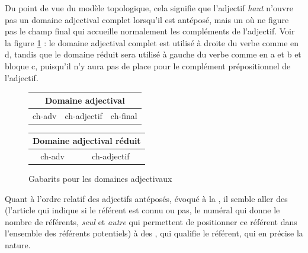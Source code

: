 {    \ea\label{ex:mur}
    \z
    \z
    
    Du point de vue du modèle topologique, cela signifie que l’adjectif \textit{haut} n’ouvre pas un domaine adjectival complet lorsqu’il est antéposé, mais un  où ne figure pas le champ final qui accueille normalement les compléments de l’adjectif. Voir la figure \ref{fig:domaine-adj} : le domaine adjectival complet est utilisé à droite du verbe comme en d, tandis que le domaine réduit sera utilisé à gauche du verbe comme en a et b et bloque c, puisqu'il n'y aura pas de place pour le complément prépositionnel de l'adjectif.

\begin{figure}[H]
    \caption{Gabarits pour les domaines adjectivaux}
    \label{fig:domaine-adj}
        \begin{center}
    \def\arraystretch{1.5}
    \setlength{\tabcolsep}{4ex}
    \begin{tabular}{|c|c|c|}
    \hline
    \multicolumn{3}{|c|}{\cellcolor{lsDOIGray}Domaine adjectival}\\\hline
    ch-adv & \cellcolor{lsDOIGray} ch-adjectif & ch-final\\
    \hline
    \end{tabular}
    \end{center}
   \begin{center}
    \def\arraystretch{1.5}
    \setlength{\tabcolsep}{4ex}
    \begin{tabular}{|c|c|}
    \hline
    \multicolumn{2}{|c|}{\cellcolor{lsDOIGray}Domaine adjectival réduit}\\\hline
    ch-adv & \cellcolor{lsDOIGray}ch-adjectif\\
    \hline
    \end{tabular}
    \end{center}
\end{figure}

    Quant à l’ordre relatif des adjectifs antéposés, évoqué à la , il semble aller des  (l’article qui indique si le référent est connu ou pas, le numéral qui donne le nombre de référents, \textit{seul} et \textit{autre} qui permettent de positionner ce référent dans l’ensemble des référents potentiels) à des , qui qualifie le référent, qui en précise la nature.
}
